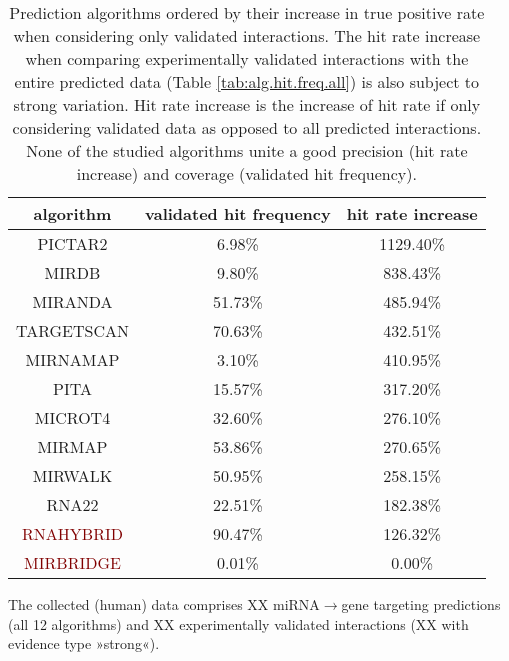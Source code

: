 \begin{table}
\centering
\begin{tabular}{c | c | c}
algorithm & validated hit frequency & hit rate increase\\ \hline
\hline
\textcolor{OliveGreen}{PICTAR2} & 6.98\% & 1129.40\%\\ \hline
\textcolor{OliveGreen}{MIRDB} & 9.80\% & 838.43\%\\ \hline
\textcolor{OliveGreen}{MIRANDA} & 51.73\% & 485.94\%\\ \hline
\textcolor{OliveGreen}{TARGETSCAN} & 70.63\% & 432.51\%\\ \hline
\textcolor{OliveGreen}{MIRNAMAP} & 3.10\% & 410.95\%\\ \hline
\textcolor{OliveGreen}{PITA} & 15.57\% & 317.20\%\\ \hline
\textcolor{OliveGreen}{MICROT4} & 32.60\% & 276.10\%\\ \hline
\textcolor{OliveGreen}{MIRMAP} & 53.86\% & 270.65\%\\ \hline
\textcolor{OliveGreen}{MIRWALK} & 50.95\% & 258.15\%\\ \hline
\textcolor{OliveGreen}{RNA22} & 22.51\% & 182.38\%\\ \hline
\textcolor{Maroon}{RNAHYBRID} & 90.47\% & 126.32\%\\ \hline
\textcolor{Maroon}{MIRBRIDGE} & 0.01\% & 0.00\%\\ \hline
\end{tabular}
\caption{Prediction algorithms ordered by their increase in true positive rate when considering only validated interactions. The hit rate increase when comparing experimentally validated interactions with the entire predicted data (Table \ref{tab:alg.hit.freq.all}) is also subject to strong variation. Hit rate increase is the increase of hit rate if only considering validated data as opposed to all predicted interactions. None of the studied algorithms unite a good precision (hit rate increase) and coverage (validated hit frequency).}
\label{tab:alg.hit.freq.val}
\end{table}


The collected (human) data comprises XX miRNA$\to$gene targeting predictions (all 12 algorithms) and XX experimentally validated interactions (XX with evidence type »strong«).

